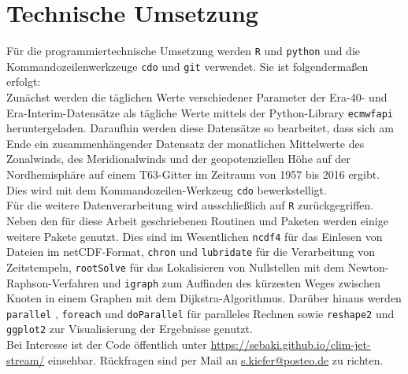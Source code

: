 \section{Technische Umsetzung}
Für die programmiertechnische Umsetzung werden \texttt{R} und \texttt{python} und die Kommando\-zeilen\-werkzeuge \texttt{cdo} und \texttt{git} verwendet. Sie ist folgendermaßen erfolgt: 
\\
Zunächst werden die täglichen Werte verschiedener Parameter der Era-40- und Era-Interim-Datensätze als tägliche Werte mittels der Python-Library \texttt{ecmwfapi} \citep{ecmwfapi} heruntergeladen. Daraufhin werden diese Datensätze so bearbeitet, dass sich am Ende ein zusammenhängender Datensatz der monatlichen Mittelwerte des Zonalwinds, des Meridionalwinds und der geopotenziellen Höhe auf der Nordhemisphäre auf einem T63-Gitter im Zeitraum von 1957 bis 2016 ergibt. Dies wird mit dem Kommandozeilen-Werkzeug \texttt{cdo} \citep{cdo-2015} bewerkstelligt.
\\
Für die weitere Datenverarbeitung wird ausschließlich auf \texttt{R} \citep{R-2017} zurückgegriffen. Neben den für diese Arbeit geschriebenen Routinen und Paketen werden einige weitere Pakete genutzt. Dies sind im Wesentlichen \texttt{ncdf4} \citep{ncdf4-2017} für das Einlesen von Dateien im netCDF-Format, \texttt{chron} \citep{chron-2017} und \texttt{lubridate} \citep{lubridate-2011} für die Verarbeitung von Zeitstempeln, \texttt{rootSolve} \citep{rootSolve-2009} für das Lokalisieren von Nullstellen mit dem Newton-Raphson-Verfahren und \texttt{igraph} \citep{igraph-2006} zum Auffinden des kürzesten Weges zwischen Knoten in einem Graphen mit dem Dijkstra-Algorithmus.
Darüber hinaus werden \texttt{parallel} \citep{R-2017}, \texttt{foreach} \citep{foreach-2015} und \texttt{doParallel} \citep{doParallel-2015} für paralleles Rechnen sowie \texttt{reshape2} \citep{reshape2-2007} und \texttt{ggplot2} \citep{ggplot2-2009} zur Visualisierung der Ergebnisse genutzt.
\\
Bei Interesse ist der Code öffentlich unter \url{https://sebaki.github.io/clim-jet-stream/} einsehbar. Rückfragen sind per Mail an {\url{s.kiefer@posteo.de}} zu richten.
